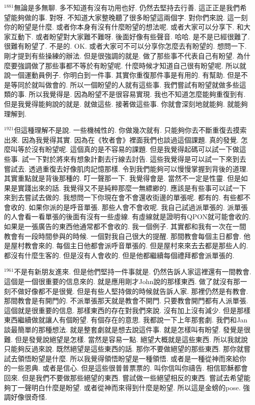 \documentclass{book}
\begin{document}
$^{1881}$無論是多無聊.
多不知道有沒有功用也好.
仍然去堅持去行善.
這正正是我們希望能夠做的事.
對呀.
不知道大家整晚聽了很多盼望這兩個字.
對你們來說.
這一刻你的盼望是什麼.
或者你本身有沒有什麼盼望的想法呢.
或者大家可以分享下.
和大家互動下.
或者盼望對大家難不難呀.
後面好像有些聲音.
哈哈.
是不是已經很難了.
很難有盼望了.
不是的.
OK.
或者大家可不可以分享你怎麼去有盼望的.
想問一下.
剛才提到有些操練的辦法.
但是很強調的就是.
做了那些事不代表自己有盼望.
為什麼要強調做了那些事都不等於有盼望呢.
什麼時候才知道自己很有盼望呢.
所以就說一個運動員例子.
你明白到一件事.
其實你重復那件事是有用的.
有幫助.
但是不是等同於就叫做會的.
所以一個盼望的人就有這些事.
我們嘗試有盼望就做多些這類的事.
所以我覺得是.
因為盼望不是很容易實現.
我也不知道怎麼能夠重復到有.
但是我覺得能夠說的就是.
就做這些.
接著做這些事.
你就會深刻地就能夠.
就能夠理解到.

$^{1921}$但這種理解不是說.
一些機械性的.
你做幾次就有.
只能夠你去不斷重復去摸索出來.
因為我覺得其實.
因為在《牧者會》裡面我們也談過這個課題.
真的發覺.
怎麼叫等於沒有盼望呢.
這個真的是不容易的課題.
但是我覺得起碼可以試一下做這些事.
試一下對於將來有想象計劃去行線去討告.
這些我覺得是可以試一下來到去嘗試去.
透過重復去好像肌肉記憶那樣.
令到我們能夠可以慢慢掌握到背後的道理.
其實重點就是背後那種的.
叮一聲那一下.
我覺得會是.
當然不一定是性靈.
但是如果是實踐出來的話.
我覺得又不是純粹那麼一無縹緲的.
應該是有些事可以試一下來到去嘗試去做的.
我想問一下你現在會不會還收街邊的單張呢.
都有的.
有些都不會收的.
如果你派的是呼音單張.
那些人會不會收呢.
我自己試過派單張的.
派單張的人會看一看單張的後面有沒有一些虛線.
有虛線就是證明有QPON就可能會收的.
如果是一張廣告的東西他通常都不會收的.
我一個例子.
其實都和我有一次在一間教會有一段時間參與的時候.
一個對我自己很大的提醒.
那間教會每個主日都會.
他是屋村教會來的.
每個主日他都會派呼音單張的.
但是屋村來來去去都是那些人的.
都沒有什麼生客的.
但是沒有人會收的.
但是他都繼續每個禮拜都會派單張的.

$^{1961}$不是有新朋友進來.
但是他們堅持一件事就是.
仍然告訴人家這裡還有一間教會.
這個是一個很重要的信息來的.
就是應用剛才John說的那樣東西.
做了就沒有那一刻不做好像都不是很覺.
但是有些人堅持做的時候就告訴人家.
那裡仍然是有教會.
那間教會是有開門的.
不派單張那天就是教會不開門.
只要教會開門都有人派單張.
這個就是很重要的信息.
那樣東西的存在對我們來說.
沒有加上沒有減少.
但是那樣東西繼續做就讓人有個盼望.
有個存在的意思.
我都說一下上年那套劇.
我們和Jan談最簡單的那種想法.
就是整套劇就是想去說這件事.
就是怎樣叫有盼望.
發覺是很難.
但是發覺說絕望是怎樣.
當然是容易一點.
絕望大概就是這些東西.
所以我就說只能夠反過來說.
既然絕望是這些東西的話.
那你不要做絕望的那些東西.
那你就嘗試去領悟盼望是什麼.
所以我覺得領悟盼望是一種領悟.
或者是一種從神而來給你的一些恩典.
或者是信心.
但是這些很普普票票的.
叫你信叫你禱告.
相信耶穌都會回來.
但是我們不要做那些絕望的東西.
嘗試做一些絕望相反的東西.
嘗試去希望能夠丁一聲明白什麼是盼望.
或者從神而來得到什麼是盼望.
所以這是金螃的pose.
強調好像很奇怪.
\end{document}
